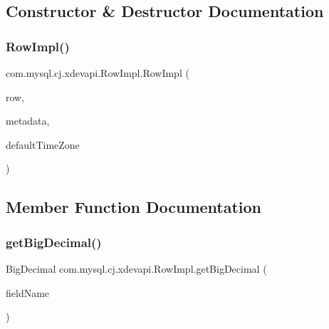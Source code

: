 \subsection{Constructor \& Destructor Documentation}
\mbox{\label{classcom_1_1mysql_1_1cj_1_1xdevapi_1_1_row_impl_af687747767168ead978243dd23987353}} 
\subsubsection{\texorpdfstring{Row\+Impl()}{RowImpl()}}
{\footnotesize\ttfamily com.\+mysql.\+cj.\+xdevapi.\+Row\+Impl.\+Row\+Impl (\begin{DoxyParamCaption}\item[{\mbox{\hyperlink{interfacecom_1_1mysql_1_1cj_1_1result_1_1_row}{Row}}}]{row,  }\item[{\mbox{\hyperlink{interfacecom_1_1mysql_1_1cj_1_1protocol_1_1_column_definition}{Column\+Definition}}}]{metadata,  }\item[{Time\+Zone}]{default\+Time\+Zone }\end{DoxyParamCaption})}



\subsection{Member Function Documentation}
\mbox{\label{classcom_1_1mysql_1_1cj_1_1xdevapi_1_1_row_impl_ada7aa558c2ae857cf3f7b62dbc3b9fd0}} 
\subsubsection{\texorpdfstring{get\+Big\+Decimal()}{getBigDecimal()}\hspace{0.1cm}{\footnotesize\ttfamily [1/2]}}
{\footnotesize\ttfamily Big\+Decimal com.\+mysql.\+cj.\+xdevapi.\+Row\+Impl.\+get\+Big\+Decimal (\begin{DoxyParamCaption}\item[{String}]{field\+Name }\end{DoxyParamCaption})}

